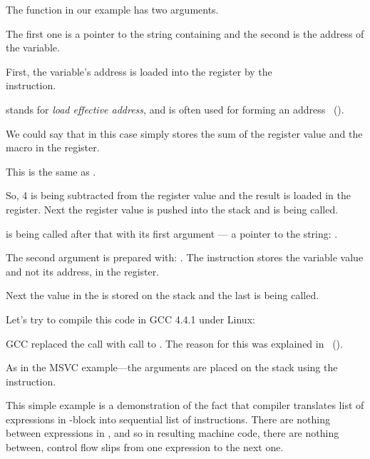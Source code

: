 The \scanf function in our example has two arguments.

The first one is a pointer to the string containing  and the second is the address of the  variable.

First, the  variable's address is loaded into the \EAX register by the \\
 instruction.

\LEA stands for \emph{load effective address}, and is often used for forming an address ~().

We could say that in this case \LEA simply stores the sum of the \EBP register value and the  macro in the \EAX register.

This is the same as .

So, 4 is being subtracted from the \EBP register value and the result is loaded in the \EAX register.
Next the \EAX register value is pushed into the stack and \scanf is being called.

\printf is being called after that with its first argument --- a pointer to the string:
.

The second argument is prepared with: .
The instruction stores the  variable value and not its address, in the \ECX register.

Next the value in the \ECX is stored on the stack and the last \printf is being called.




Let's try to compile this code in GCC 4.4.1 under Linux:



GCC replaced the \printf call with call to \puts. The reason for this was explained in ~().

% 

As in the MSVC example---the arguments are placed on the stack using the \MOV instruction.


This simple example is a demonstration of the fact that compiler translates
list of expressions in \CCpp-block into sequential list of instructions.
There are nothing between expressions in \CCpp, and so in resulting machine code, 
there are nothing between, control flow slips from one expression to the next one.

